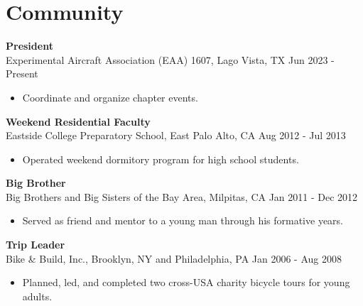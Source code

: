 \section{Community}

\textbf{President} \\
Experimental Aircraft Association (EAA) 1607, Lago Vista, TX \hfill Jun 2023 - Present
\begin{itemize}  \itemsep -2pt %
\item Coordinate and organize chapter events.
\end{itemize}

\textbf{Weekend Residential Faculty} \\
Eastside College Preparatory School, East Palo Alto, CA \hfill Aug 2012 - Jul 2013
\begin{itemize}  \itemsep -2pt %
\item Operated weekend dormitory program for high school students.
\end{itemize}

\textbf{Big Brother} \\
Big Brothers and Big Sisters of the Bay Area, Milpitas, CA \hfill Jan 2011 - Dec 2012
\begin{itemize}  \itemsep -2pt %
\item Served as friend and mentor to a young man through his formative years.
\end{itemize}

\textbf{Trip Leader} \\
Bike \& Build, Inc., Brooklyn, NY and Philadelphia, PA \hfill Jan 2006 - Aug 2008
\begin{itemize}  \itemsep -2pt %
\item Planned, led, and completed two cross-USA charity bicycle tours for young adults.
\end{itemize}

